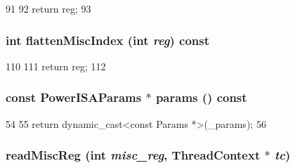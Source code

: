 \begin{DoxyCode}
91     {
92         return reg;
93     }
\end{DoxyCode}
\hypertarget{classPowerISA_1_1ISA_a8997760aa4425793911f57440a4dd8ae}{
\subsubsection[{flattenMiscIndex}]{\setlength{\rightskip}{0pt plus 5cm}int flattenMiscIndex (int {\em reg}) const}}
\label{classPowerISA_1_1ISA_a8997760aa4425793911f57440a4dd8ae}



\begin{DoxyCode}
110     {
111         return reg;
112     }
\end{DoxyCode}
\hypertarget{classPowerISA_1_1ISA_af2c956efac72df6a2cb0157aa356e70f}{
\subsubsection[{params}]{\setlength{\rightskip}{0pt plus 5cm}const PowerISAParams $\ast$ params () const}}
\label{classPowerISA_1_1ISA_af2c956efac72df6a2cb0157aa356e70f}



\begin{DoxyCode}
54 {
55     return dynamic_cast<const Params *>(_params);
56 }
\end{DoxyCode}
\hypertarget{classPowerISA_1_1ISA_a5e47db3953e6f623b58fee4f22a406bd}{
\subsubsection[{readMiscReg}]{ readMiscReg (int {\em misc\_\-reg}, \/  {\bf ThreadContext} $\ast$ {\em tc})}}
\label{classPowerISA_1_1ISA_a5e47db3953e6f623b58fee4f22a406bd}



